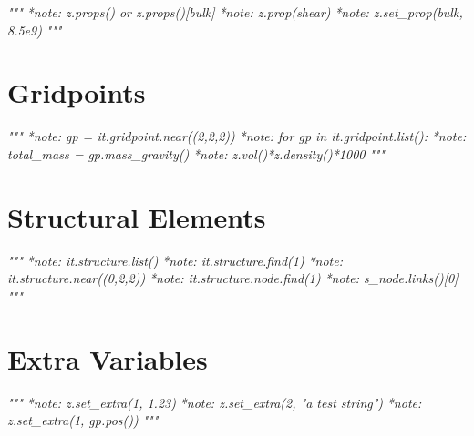 \documentclass[a4paper, nobind]{templates/ociamthesis}
\newenvironment{Shaded}{\begin{snugshade}}{\end{snugshade}}
\newcommand{\CommentTok}[1]{\textcolor[rgb]{0.56,0.35,0.01}{\textit{#1}}}
\renewenvironment{Shaded}
{
  \vspace{10pt}%
  \begin{snugshade}%
}{%
  \end{snugshade}%
  \vspace{8pt}%
}
\begin{document}
\begin{Shaded}
\begin{Highlighting}[]
\CommentTok{"""}
\CommentTok{*note: z.props() or z.props()[\textquotesingle{}bulk\textquotesingle{}]}
\CommentTok{*note: z.prop(\textquotesingle{}shear\textquotesingle{})}
\CommentTok{*note: z.set\_prop(\textquotesingle{}bulk\textquotesingle{}, 8.5e9)}
\CommentTok{"""}
\end{Highlighting}
\end{Shaded}

\hypertarget{gridpoints}{%
\section{Gridpoints}\label{gridpoints}}

\begin{Shaded}
\begin{Highlighting}[]
\CommentTok{"""}
\CommentTok{*note: gp = it.gridpoint.near((2,2,2))}
\CommentTok{*note: for gp in it.gridpoint.list():}
\CommentTok{*note: total\_mass = gp.mass\_gravity()}
\CommentTok{*note: z.vol()*z.density()*1000}
\CommentTok{"""}
\end{Highlighting}
\end{Shaded}

\hypertarget{structural-elements}{%
\section{Structural Elements}\label{structural-elements}}

\begin{Shaded}
\begin{Highlighting}[]
\CommentTok{"""}
\CommentTok{*note: it.structure.list()}
\CommentTok{*note: it.structure.find(1)}
\CommentTok{*note: it.structure.near((0,2,2))}
\CommentTok{*note: it.structure.node.find(1)}
\CommentTok{*note: s\_node.links()[0]}
\CommentTok{"""}
\end{Highlighting}
\end{Shaded}

\hypertarget{extra-variables}{%
\section{Extra Variables}\label{extra-variables}}

\begin{Shaded}
\begin{Highlighting}[]
\CommentTok{"""}
\CommentTok{*note: z.set\_extra(1, 1.23)}
\CommentTok{*note: z.set\_extra(2, "a test string")}
\CommentTok{*note: z.set\_extra(1, gp.pos())}
\CommentTok{"""}
\end{Highlighting}
\end{Shaded}
\end{document}

